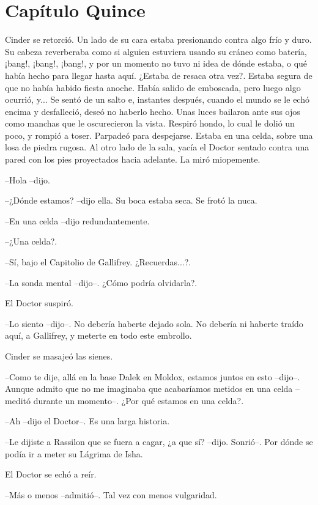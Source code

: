 \chapter*{Capítulo Quince}

Cinder se retorció. Un lado de su cara estaba presionando contra algo frío y duro. Su cabeza reverberaba como si alguien estuviera usando su cráneo como batería, ¡bang!, ¡bang!, ¡bang!, y por un momento no tuvo ni idea de dónde estaba, o qué había hecho para llegar hasta aquí. ¿Estaba de resaca otra vez?. Estaba segura de que no había habido fiesta anoche. Había salido de emboscada, pero luego algo ocurrió, y...
Se sentó de un salto e, instantes después, cuando el mundo se le echó encima y desfalleció, deseó no haberlo hecho. Unas luces bailaron ante sus ojos como manchas que le oscurecieron la vista. Respiró hondo, lo cual le dolió un poco, y rompió a toser. Parpadeó para despejarse.
Estaba en una celda, sobre una losa de piedra rugosa. Al otro lado de la sala, yacía el Doctor sentado contra una pared con los pies proyectados hacia adelante. La miró miopemente.

--Hola --dijo.

--¿Dónde estamos? --dijo ella. Su boca estaba seca. Se frotó la nuca.

--En una celda --dijo redundantemente.

--¿Una celda?.

--Sí, bajo el Capitolio de Gallifrey. ¿Recuerdas...?.

--La sonda mental --dijo--. ¿Cómo podría olvidarla?.

El Doctor suspiró.

--Lo siento --dijo--. No debería haberte dejado sola. No debería ni haberte traído aquí, a Gallifrey, y meterte en todo este embrollo.

Cinder se masajeó las sienes.

--Como te dije, allá en la base Dalek en Moldox, estamos juntos en esto --dijo--. Aunque admito que no me imaginaba que acabaríamos metidos en una celda --meditó durante un momento--. ¿Por qué estamos en una celda?.

--Ah --dijo el Doctor--. Es una larga historia.

--Le dijiste a Rassilon que se fuera a cagar, ¿a que sí? --dijo. Sonrió--. Por dónde se podía ir a meter su Lágrima de Isha.

El Doctor se echó a reír.

--Más o menos --admitió--. Tal vez con menos vulgaridad.


